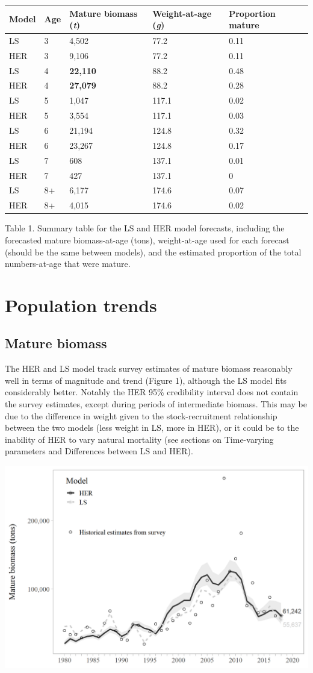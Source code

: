 \documentclass[]{article}
\begin{document}
\begin{longtable}[]{@{}lllll@{}}
\toprule
Model & Age & Mature biomass (\emph{t}) & Weight-at-age (\emph{g}) &
Proportion mature\tabularnewline
\midrule
\endhead
LS & 3 & 4,502 & 77.2 & 0.11\tabularnewline
HER & 3 & 9,106 & 77.2 & 0.11\tabularnewline
LS & 4 & \textbf{22,110} & 88.2 & 0.48\tabularnewline
HER & 4 & \textbf{27,079} & 88.2 & 0.28\tabularnewline
LS & 5 & 1,047 & 117.1 & 0.02\tabularnewline
HER & 5 & 3,554 & 117.1 & 0.03\tabularnewline
LS & 6 & 21,194 & 124.8 & 0.32\tabularnewline
HER & 6 & 23,267 & 124.8 & 0.17\tabularnewline
LS & 7 & 608 & 137.1 & 0.01\tabularnewline
HER & 7 & 427 & 137.1 & 0\tabularnewline
LS & 8+ & 6,177 & 174.6 & 0.07\tabularnewline
HER & 8+ & 4,015 & 174.6 & 0.02\tabularnewline
\bottomrule
\end{longtable}

Table 1. Summary table for the LS and HER model forecasts, including the
forecasted mature biomass-at-age (tons), weight-at-age used for each
forecast (should be the same between models), and the estimated
proportion of the total numbers-at-age that were mature.

\section{Population trends}\label{population-trends}

\subsection{Mature biomass}\label{mature-biomass}

The HER and LS model track survey estimates of mature biomass reasonably
well in terms of magnitude and trend (Figure 1), although the LS model
fits considerably better. Notably the HER 95\% credibility interval does
not contain the survey estimates, except during periods of intermediate
biomass. This may be due to the difference in weight given to the
stock-recruitment relationship between the two models (less weight in
LS, more in HER), or it could be to the inability of HER to vary natural
mortality (see sections on Time-varying parameters and Differences
between LS and HER).

\includegraphics[width=1\linewidth]{../../HER/figs/compare_matbiomass}
\end{document}
